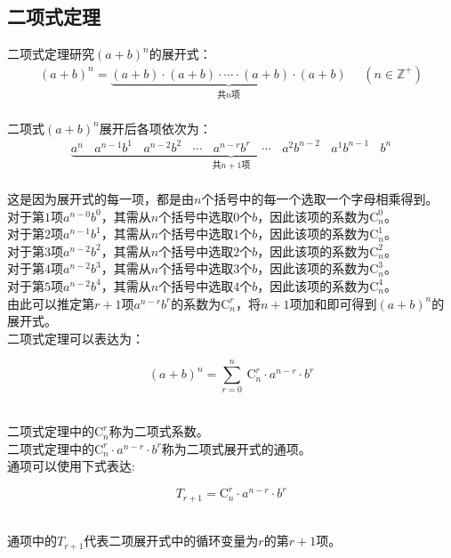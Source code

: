 \documentclass[UTF8]{ctexart}
\newcommand{\Co}{\mathrm{C}}
\begin{document}
\subsection{二项式定理}
    \setcounter{equation}{0}
    二项式定理研究$(a+b)^n$的展开式：
    \begin{align}
        (a+b)^n=\underbrace{(a+b)\cdot(a+b)\cdot\cdots\cdot(a+b)\cdot(a+b)}_{\text{共}n\text{项}}~~~~~~(n\in\mathbb{Z^+})
    \end{align}\\
    二项式$(a+b)^n$展开后各项依次为：
    \begin{align}
        \underbrace{a^{n}~~~~a^{n-1}b^1~~~~a^{n-2}b^2~~~~\cdots~~~~a^{n-r}b^r~~~~\cdots~~~~a^2b^{n-2}~~~~a^1b^{n-1}~~~~b^{n}}_{\text{共}n+1\text{项}}
    \end{align}\\
    这是因为展开式的每一项，都是由$n$个括号中的每一个选取一个字母相乘得到。\\[3mm]
    对于第$1$项$a^{n-0}b^0$，其需从$n$个括号中选取$0$个$b$，因此该项的系数为$\Co_n^0$。\\[3mm]
    对于第$2$项$a^{n-1}b^1$，其需从$n$个括号中选取$1$个$b$，因此该项的系数为$\Co_n^1$。\\[3mm]
    对于第$3$项$a^{n-2}b^2$，其需从$n$个括号中选取$2$个$b$，因此该项的系数为$\Co_n^2$。\\[3mm]
    对于第$4$项$a^{n-2}b^3$，其需从$n$个括号中选取$3$个$b$，因此该项的系数为$\Co_n^3$。\\[3mm]
    对于第$5$项$a^{n-2}b^4$，其需从$n$个括号中选取$4$个$b$，因此该项的系数为$\Co_n^4$。\\[3mm]
    由此可以推定第$r+1$项$a^{n-r}b^r$的系数为$\Co_n^r$，将$n+1$项加和即可得到$(a+b)^n$的展开式。\\[8mm]
    二项式定理可以表达为：
    \begin{large}
        \begin{equation*}
            (a+b)^n=\sum_{r=0}^{n}~\Co_n^r\cdot a^{n-r}\cdot b^r
        \end{equation*}
    \end{large}\\
    二项式定理中的$\Co_n^r$称为二项式系数。\\[3mm]
    二项式定理中的$\Co_n^r\cdot a^{n-r}\cdot b^r$称为二项式展开式的通项。\\[10mm]
    通项可以使用下式表达:
    \begin{large}
        \begin{equation*}
            T_{r+1}=\Co_n^r\cdot a^{n-r}\cdot b^r
        \end{equation*}
    \end{large}\\
    通项中的$T_{r+1}$代表二项展开式中的循环变量为$r$的第$r+1$项。
\end{document}
